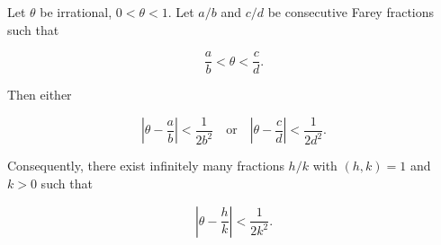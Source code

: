 Let $\theta$ be irrational, $0 < \theta < 1$. Let $a/b$ and $c/d$ be consecutive Farey fractions such that

$$\frac{a}{b} < \theta < \frac{c}{d}.$$

Then either

$$\left|\theta - \frac{a}{b}\right| < \frac{1}{2b^2} \quad \text{or} \quad \left|\theta - \frac{c}{d}\right| < \frac{1}{2d^2}.$$

Consequently, there exist infinitely many fractions $h/k$ with $(h, k) = 1$ and $k > 0$ such that

$$\left|\theta - \frac{h}{k}\right| < \frac{1}{2k^2}.$$
